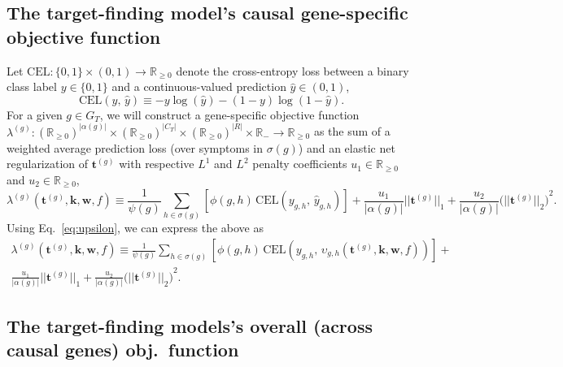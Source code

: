 \documentclass[11pt,notitlepage,english]{article}
\begin{document}
\subsection{The target-finding model's causal gene-specific objective function}
Let $\textrm{CEL}: \{0,1\} \times (0,1) \rightarrow {\mathbb R}_{\geq 0}$ denote the cross-entropy loss
between a binary class label $y \in \{0,1\}$ and a continuous-valued prediction
$\widehat{y} \in (0,1)$,
\begin{equation}
\textrm{CEL}(y, \, \widehat{y}) \equiv -y \log(\widehat{y}) - (1-y) \log(1-\widehat{y}).
\end{equation}
For a given $g \in G_T$, we will construct a gene-specific objective
function
$\lambda^{(g)}: {({\mathbb R}_{\geq 0})}^{|\alpha(g)|} \times {({\mathbb R}_{\geq 0})}^{|C_T|} \times {({\mathbb R}_{\geq 0})}^{|R|} \times {\mathbb R}_{-} \rightarrow {\mathbb R}_{\geq 0}$
as the sum of a weighted average prediction loss (over symptoms
in $\sigma(g)$) and an elastic net regularization of ${\boldsymbol t}^{(g)}$
with respective $L^1$ and $L^2$ penalty coefficients $u_1 \in {\mathbb R}_{\geq
  0}$ and $u_2 \in {\mathbb R}_{\geq 0}$,
\begin{equation}
  \label{eq:lambdag}
  \lambda^{(g)}(
{\boldsymbol t}^{(g)}, {\boldsymbol k}, {\boldsymbol w},
f) \equiv  \frac{1}{\psi(g)}
  \sum\limits_{h \in \sigma(g)}
  \left[ \phi(g, h)\, \textrm{CEL}\!\left(y_{g,h}, \, \widehat{y}_{g,h} \right) \right]  +  
  \frac{u_1}{|\alpha(g)|} ||{\boldsymbol
    t}^{(g)}||_1
  + \frac{u_2}{|\alpha(g)|} {\bigl(||{\boldsymbol t}^{(g)}||_2\bigr)}^2.
\end{equation}
Using Eq.~\ref{eq:upsilon}, we can express the above as
\begin{multline}
  \label{eq:lambdag}
  \lambda^{(g)}(
{\boldsymbol t}^{(g)}, {\boldsymbol k}, {\boldsymbol w},
f) \equiv  \frac{1}{\psi(g)}
  \sum\limits_{h \in \sigma(g)}
  \left[ \phi(g, h)\, \textrm{CEL}\!\left(y_{g,h}, \, \upsilon_{g,h}(
{\boldsymbol t}^{(g)}, {\boldsymbol k}, {\boldsymbol w},
f)\right) \right]  + \\
  \frac{u_1}{|\alpha(g)|} ||{\boldsymbol
    t}^{(g)}||_1
  + \frac{u_2}{|\alpha(g)|} {\bigl(||{\boldsymbol t}^{(g)}||_2\bigr)}^2.
\end{multline}

\subsection{The target-finding models's overall (across causal genes) obj.~function}
\end{document}

